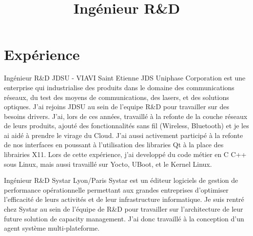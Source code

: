 \documentclass[11pt,a4paper,sans]{moderncv}
\title{Ing\'enieur R\&D}
\begin{document}
\makecvtitle

\section{Exp\'erience}

{Ing\'enieur R\&D}
{JDSU - VIAVI}
{Saint Etienne}
{}
{JDS Uniphase Corporation est une enterprise qui industrialise des produits
dans le domaine des communications r\'eseaux, du test des moyens de
communications, des lasers, et des solutions optiques.
J'ai rejoins JDSU au sein de l'equipe R\&D pour travailler sur des besoins
drivers. J'ai, lors de ces ann\'ees, travaill\'e \`a la refonte de la couche
r\'eseaux de leurs produits, ajout\'e des fonctionnalit\'es sans fil
(Wireless, Bluetooth) et je les ai aid\'e \`a prendre le virage du Cloud.
J'ai aussi activement particip\'e \`a la refonte de nos interfaces en poussant
\`a l'utilisation des libraries Qt \`a la place des librairies X11.
Lors de cette exp\'erience, j'ai developp\'e du code m\'etier en C C++ sous
Linux, mais aussi travaill\'e sur Yocto, UBoot, et le Kernel Linux.
}

{Ing\'enieur R\&D}
{Systar}
{Lyon/Paris}
{}
{Systar est un \'editeur logiciels de gestion de performance 
op\'erationnelle permettant aux grandes entreprises d'optimiser l'efficacit\'e
de leurs activit\'es et de leur infrastructure informatique. 
Je suis rentr\'e chez Systar au sein de l'\'equipe de R\&D pour travailler sur 
l'architecture de leur future solution de capacity management. J'ai donc
travaill\'e \`a la conception d'un agent syst\`eme multi-plateforme.
}
\end{document}
